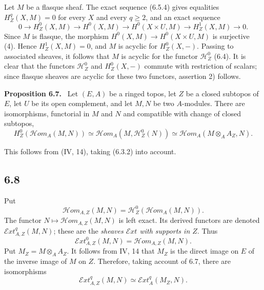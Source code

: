 \documentclass[11pt]{article}
\newcommand{\Hh}{\mathcal{H}}
\newcommand{\Hhom}{\mathcal{H}om}
\newcommand{\Eext}{\mathcal{E}xt}
\newenvironment{statement}[1]{\par\medskip\noindent\textbf{#1.}\ }{\par\medskip}
\begin{document}
Let $M$ be a flasque sheaf. The exact sequence (6.5.4) gives equalities $H_Z^q(X,M)=0$ for every $X$ and every $q\geq 2$, and an exact sequence
\[
0\to H_Z^0(X,M)\to H^0(X,M)\to H^0(X\times U,M)\to H_Z^1(X,M)\to 0.
\]
Since $M$ is flasque, the morphism $H^0(X,M)\to H^0(X\times U,M)$ is surjective (4). Hence $H_Z^1(X,M)=0$, and $M$ is acyclic for $H_Z^0(X,-)$. Passing to associated sheaves, it follows that $M$ is acyclic for the functor $\Hh_Z^0$ (6.4). It is clear that the functors $\Hh_Z^0$ and $H_Z^0(X,-)$ commute with restriction of scalars; since flasque sheaves are acyclic for these two functors, assertion 2) follows.

\begin{statement}{Proposition 6.7}
Let $(E,A)$ be a ringed topos, let $Z$ be a closed subtopos of $E$, let $U$ be its open complement, and let $M,N$ be two $A$-modules. There are isomorphisms, functorial in $M$ and $N$ and compatible with change of closed subtopos,
\[
        H_Z^0(\Hhom_A(M,N))\simeq \Hhom_A(M,\Hh_Z^0(N))\simeq \Hhom_A(M\otimes_A A_Z,N).
\]
\end{statement}

This follows from (IV, 14), taking (6.3.2) into account.

\subsection*{6.8}
Put
\begin{equation*}
        \Hhom_{A,Z}(M,N)=\Hh_Z^0(\Hhom_A(M,N)).\tag{6.8.1}
\end{equation*}
The functor $N\mapsto \Hhom_{A,Z}(M,N)$ is left exact. Its derived functors are denoted $\Eext_{A,Z}^q(M,N)$; these are the \emph{sheaves $\Eext$ with supports in $Z$}. Thus
\begin{equation*}
        \Eext_{A,Z}^0(M,N)=\Hhom_{A,Z}(M,N).\tag{6.8.2}
\end{equation*}
Put $M_Z=M\otimes_A A_Z$. It follows from IV, 14 that $M_Z$ is the direct image on $E$ of the inverse image of $M$ on $Z$. Therefore, taking account of 6.7, there are isomorphisms
\begin{equation*}
        \Eext_{A,Z}^q(M,N)\simeq \Eext_A^q(M_Z,N).\tag{6.8.3}
\end{equation*}
\end{document}

